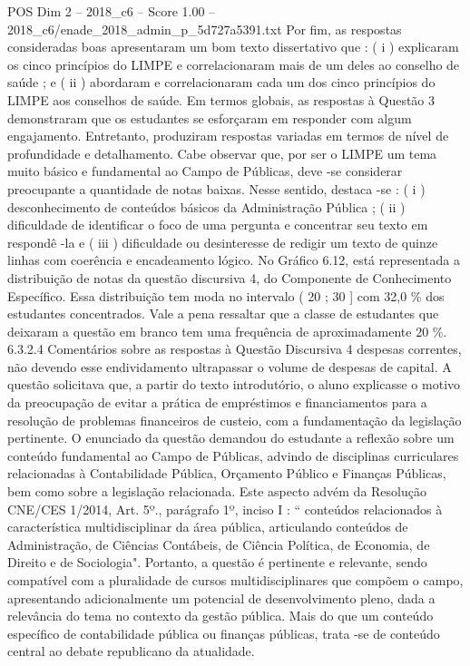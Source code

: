 \begin{textsample}{POS Dim 2 – 2018\_c6 – Score 1.00 – 2018\_c6/enade\_2018\_admin\_p\_5d727a5391.txt}
Por fim, as respostas consideradas boas apresentaram um bom texto dissertativo que : ( i ) explicaram os cinco princípios do LIMPE e correlacionaram mais de um deles ao conselho de saúde ; e ( ii ) abordaram e correlacionaram cada um dos cinco princípios do LIMPE aos conselhos de saúde.
Em termos globais, as respostas à Questão 3 demonstraram que os estudantes se esforçaram em responder com algum engajamento.
Entretanto, produziram respostas variadas em termos de nível de profundidade e detalhamento.
Cabe observar que, por ser o LIMPE um tema muito básico e fundamental ao Campo de Públicas, deve -se considerar preocupante a quantidade de notas baixas.
Nesse sentido, destaca -se : ( i ) desconhecimento de conteúdos básicos da Administração Pública ; ( ii ) dificuldade de identificar o foco de uma pergunta e concentrar seu texto em respondê -la e ( iii ) dificuldade ou desinteresse de redigir um texto de quinze linhas com coerência e encadeamento lógico.
No Gráfico 6.12, está representada a distribuição de notas da questão discursiva 4, do Componente de Conhecimento Específico.
Essa distribuição tem moda no intervalo ( 20 ; 30 ] com 32,0 \% dos estudantes concentrados.
Vale a pena ressaltar que a classe de estudantes que deixaram a questão em branco tem uma frequência de aproximadamente 20 \%. 6.3.2.4 Comentários sobre as respostas à Questão Discursiva 4 despesas correntes, não devendo esse endividamento ultrapassar o volume de despesas de capital.
A questão solicitava que, a partir do texto introdutório, o aluno explicasse o motivo da preocupação de evitar a prática de empréstimos e financiamentos para a resolução de problemas financeiros de custeio, com a fundamentação da legislação pertinente.
O enunciado da questão demandou do estudante a reflexão sobre um conteúdo fundamental ao Campo de Públicas, advindo de disciplinas curriculares relacionadas à Contabilidade Pública, Orçamento Público e Finanças Públicas, bem como sobre a legislação relacionada.
Este aspecto advém da Resolução CNE/CES 1/2014, Art. 5º., parágrafo 1º, inciso I : “ conteúdos relacionados à característica multidisciplinar da área pública, articulando conteúdos de Administração, de Ciências Contábeis, de Ciência Política, de Economia, de Direito e de Sociologia".
Portanto, a questão é pertinente e relevante, sendo compatível com a pluralidade de cursos multidisciplinares que compõem o campo, apresentando adicionalmente um potencial de desenvolvimento pleno, dada a relevância do tema no contexto da gestão pública.
Mais do que um conteúdo específico de contabilidade pública ou finanças públicas, trata -se de conteúdo central ao debate republicano da atualidade.

\end{textsample}
